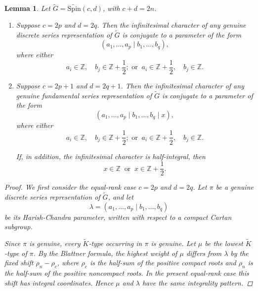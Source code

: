 \documentclass{amsart}
\newcommand{\Spin}{{\mathrm{Spin}}}
\newtheorem{lemma}[thm]{Lemma}
\theoremstyle{definition}
\begin{document}
\begin{lemma}\label{lem:genuine-infinitesimal-character-pattern}
Let $\widetilde G=\widetilde{\Spin}(c,d)$, with $c+d=2n$.
\begin{enumerate}
\item Suppose $c=2p$ and $d=2q$. Then the infinitesimal character of any genuine discrete series representation of $\widetilde G$ is conjugate to a parameter of the form
\begin{equation*}
(a_1,\ldots,a_p\mid b_1,\ldots,b_q),
\end{equation*}
where either
\begin{equation*}
a_i\in\mathbb Z,\quad b_j\in\mathbb Z+\frac12; \text{ or } \ 
a_i\in\mathbb Z+\frac12,\quad b_j\in\mathbb Z.
\end{equation*}

\item Suppose $c=2p+1$ and $d=2q+1$. Then the infinitesimal character of any genuine fundamental series representation of $\widetilde G$ is conjugate to a parameter of the form
\begin{equation*}
(a_1,\ldots,a_p\mid b_1,\ldots,b_q\mid x),
\end{equation*}
where either
\begin{equation*}
a_i\in\mathbb Z,\quad b_j\in\mathbb Z+\frac12; \text{ or } \ 
a_i\in\mathbb Z+\frac12,\quad b_j\in\mathbb Z.
\end{equation*}
 
If, in addition, the infinitesimal character is half-integral, then
$$x\in\mathbb Z  \ \text{ or }   \ x\in\mathbb Z+\frac12.$$

\end{enumerate}


\begin{proof}
We first consider the equal-rank case $c=2p$ and $d=2q$. Let $\pi$ be a genuine discrete series representation of $\widetilde G$, and let
\begin{equation*}
\lambda=(a_1,\ldots,a_p\mid b_1,\ldots,b_q)
\end{equation*}
be its Harish-Chandra parameter, written with respect to a compact Cartan subgroup.

Since $\pi$ is genuine, every $\widetilde K$-type occurring in $\pi$ is genuine. Let $\mu$ be the lowest $\widetilde K$-type of $\pi$. By the Blattner formula, the highest weight of $\mu$ differs from $\lambda$ by the fixed shift $\rho_n-\rho_c$, where $\rho_c$ is the half-sum of the positive compact roots and $\rho_n$ is the half-sum of the positive noncompact roots. In the present equal-rank case this shift has integral coordinates. Hence $\mu$ and $\lambda$ have the same integrality pattern.


\end{proof}
\end{lemma}
\end{document}
